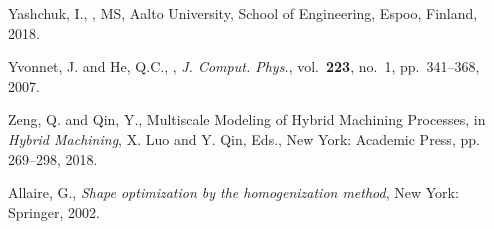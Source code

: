 \begin{thebibliography}{62}
Yashchuk, I., , MS, Aalto University,
  School of Engineering, Espoo, Finland, 2018.

Yvonnet, J. and He, Q.C., ,
  {\em J. Comput. Phys.}, vol.~{\bf 223}, no.~1, pp.~341--368,
  2007.

Zeng, Q. and Qin, Y., Multiscale Modeling of Hybrid Machining Processes, in \textit{Hybrid Machining}, X. Luo and Y. Qin, Eds., New York: Academic Press, pp. 269--298, 2018.

Allaire, G., {\em Shape optimization by the homogenization method},
 New York: Springer, 2002.

\end{thebibliography}
